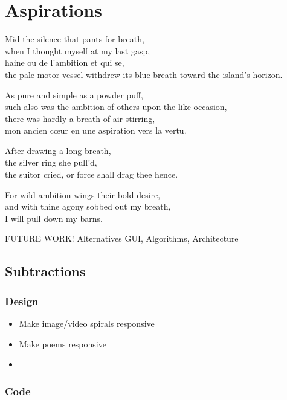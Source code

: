 
\chapter{Aspirations}
\label{ch:future}

\startcontents[chapters]

\vfill

Mid the silence that pants for breath, \\
when I thought myself at my last gasp, \\
haine ou de l'ambition et qui se, \\
the pale motor vessel withdrew its blue breath toward the island's horizon.

As pure and simple as a powder puff, \\
such also was the ambition of others upon the like occasion, \\
there was hardly a breath of air stirring, \\
mon ancien cœur en une aspiration vers la vertu.

After drawing a long breath, \\
the silver ring she pull'd, \\
the suitor cried, or force shall drag thee hence.

For wild ambition wings their bold desire, \\
and with thine agony sobbed out my breath, \\
I will pull down my barns.

\newpage
\minicontents
\spirals

FUTURE WORK!
Alternatives
GUI, Algorithms, Architecture


\section{Subtractions}

\subsection{Design}

\begin{itemize}
  \item Make image/video spirals responsive
  \item Make poems responsive
  \item
\end{itemize}

\subsection{Code}


